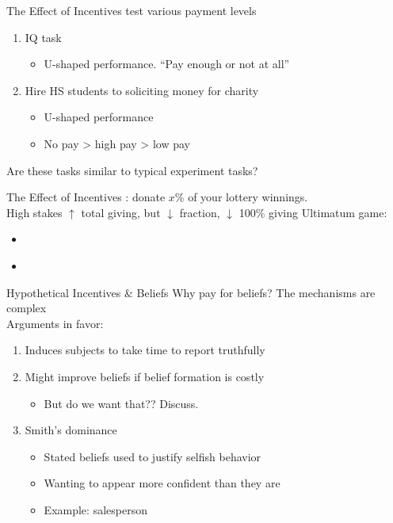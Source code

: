 \begin{frame}{The Effect of Incentives}
\citet{GneezyRustichini2000} test various payment levels
\begin{enumerate}
    \item IQ task
    \begin{itemize}
        \item U-shaped performance. ``Pay enough or not at all''
    \end{itemize}
    \item Hire HS students to soliciting money for charity
    \begin{itemize}
        \item U-shaped performance
        \item No pay > high pay > low pay
    \end{itemize}
\end{enumerate}
Are these tasks similar to typical experiment tasks?
\end{frame}

\begin{frame}{The Effect of Incentives}
\citet{Branas-GarzaEtAl2021}: donate $x$\% of your lottery winnings.\\
High stakes $\uparrow$ total giving, but $\downarrow$ fraction, $\downarrow$ 100\% giving
\br
Ultimatum game:
\begin{itemize}
    \item \citet{SlonimRoth1998}
    \item \citet{AndersenEtAl2011}
\end{itemize}
\end{frame}

\begin{frame}{Hypothetical Incentives \& Beliefs}
    Why pay for beliefs? The mechanisms are complex \citet{DanzEtAl2022}\\
    Arguments in favor:
    \begin{enumerate}
        \item Induces subjects to take time to report truthfully
        \item Might improve beliefs if belief formation is costly
        \begin{itemize}
            \item But do we want that?? Discuss.
        \end{itemize}
        \item Smith's dominance \citep{Wilde1981,Smith1982}
        \begin{itemize}
            \item Stated beliefs used to justify selfish behavior \citep{BlancoEtAl2010}
            \item Wanting to appear more confident than they are
            \item Example: salesperson
        \end{itemize}
    \end{enumerate}
\end{frame}

